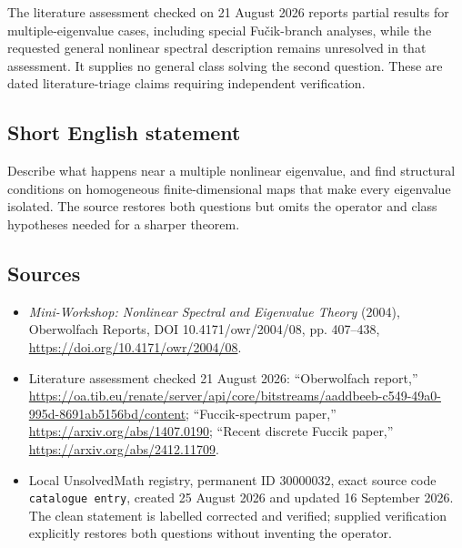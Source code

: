 \documentclass[11pt]{article}
\begin{document}
The literature assessment checked on 21 August 2026 reports partial results for multiple-eigenvalue cases, including special Fu\v cik-branch analyses, while the requested general nonlinear spectral description remains unresolved in that assessment. It supplies no general class solving the second question. These are dated literature-triage claims requiring independent verification.
\subsection{Short English statement}
Describe what happens near a multiple nonlinear eigenvalue, and find structural conditions on homogeneous finite-dimensional maps that make every eigenvalue isolated. The source restores both questions but omits the operator and class hypotheses needed for a sharper theorem.
\subsection{Sources}
\begin{itemize}
\item \emph{Mini-Workshop: Nonlinear Spectral and Eigenvalue Theory} (2004), Oberwolfach Reports, DOI 10.4171/owr/2004/08, pp. 407--438, \url{https://doi.org/10.4171/owr/2004/08}.
\item Literature assessment checked 21 August 2026: ``Oberwolfach report,'' \url{https://oa.tib.eu/renate/server/api/core/bitstreams/aaddbeeb-c549-49a0-995d-8691ab5156bd/content}; ``Fuccik-spectrum paper,'' \url{https://arxiv.org/abs/1407.0190}; ``Recent discrete Fuccik paper,'' \url{https://arxiv.org/abs/2412.11709}.
\item Local UnsolvedMath registry, permanent ID $30000032$, exact source code \texttt{catalogue entry}, created 25 August 2026 and updated 16 September 2026. The clean statement is labelled corrected and verified; supplied verification explicitly restores both questions without inventing the operator.
\end{itemize}
\end{document}

